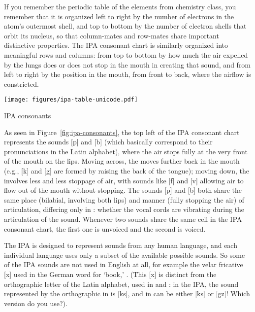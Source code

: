 

If you remember the periodic table of the elements from chemistry class, you remember that it is organized left to right by the number of electrons in the atom's outermost shell, and  top to bottom by the number of electron shells that orbit its nucleus,  so that column-mates and row-mates share important distinctive properties.  The IPA consonant chart is similarly organized into meaningful rows and columns: from top to bottom by how much the air expelled by the lungs does or does not stop in the mouth in creating that sound, and from left to right by the position in the mouth, from front to back, where the airflow is constricted.

\begin{table}[b]
\texttt{[image: figures/ipa-table-unicode.pdf]}
\caption{IPA consonants}
\label{fig:ipa-consonants}
\end{table}


As seen in Figure~\ref{fig:ipa-consonants}, the top left of the IPA consonant chart represents the sounds [p] and [b] (which basically correspond to their pronunciations in the Latin alphabet), where the air stops fully at the very front of the mouth on the lips.  Moving across, the  moves further back in the mouth (e.g., [k] and [{g}] are formed by raising the back of the tongue); moving down, the  involves less and less stoppage of air, with sounds like [f] and [v] allowing air to flow out of the mouth without stopping.  The sounds [p] and [b] both share the same place (bilabial, involving both lips) and manner (fully stopping the air) of articulation, differing only in : whether the vocal cords are vibrating during the articulation of the sound.  Whenever two sounds share the same cell in the IPA consonant chart, the first one is unvoiced and the second is voiced.



The IPA is designed to represent sounds from any human language, and each individual language uses only a subset of the available possible sounds.  So some of the IPA sounds are not used in English at all, for example the velar fricative [x] used in the German word for `book,' . (This [x] is distinct from the orthographic letter  of the Latin alphabet, used in  and : in the IPA, the sound represented by the orthographic  in  is [ks], and in  can be either [ks] or [{g}z]!  Which version do you use?).


